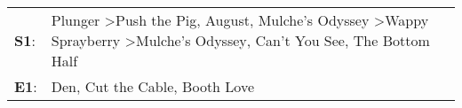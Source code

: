 \begin{supertabular}{p{0.03\textwidth}p{0.92\textwidth}}
 \textbf{S1}:  &  Plunger\textsuperscript{} \textgreater \enspace Push the Pig\textsuperscript{}, \enspace August\textsuperscript{}, \enspace Mulche's Odyssey\textsuperscript{} \textgreater \enspace Wappy Sprayberry\textsuperscript{} \textgreater \enspace Mulche's Odyssey\textsuperscript{}, \enspace Can't You See\textsuperscript{}, \enspace The Bottom Half\textsuperscript{}  \enspace  \\
 \textbf{E1}:  &                                                                                                                                                                                                                                                                  Den\textsuperscript{}, \enspace Cut the Cable\textsuperscript{}, \enspace Booth Love\textsuperscript{}  \enspace  \\
\end{supertabular}

